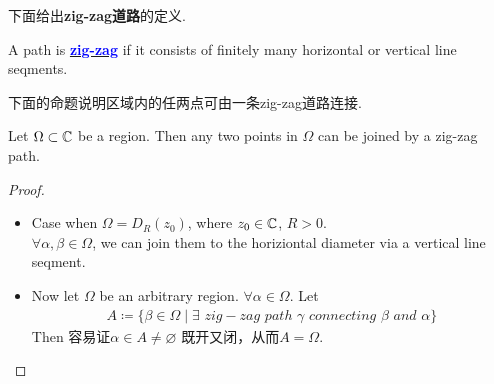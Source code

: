 	\vspace{2em}
	下面给出\textbf{zig-zag道路}的定义.
	\begin{defn}\label{def 3.4.7}
		A path is \underline{\textcolor{blue}{\textbf{zig-zag}}} if it consists of finitely many horizontal or vertical line seqments.
	\end{defn}

	\vspace{2em}
	下面的命题说明区域内的任两点可由一条zig-zag道路连接.
	\begin{proposition}\label{prop 3.4.1}
		Let $\Omega \subset \mathbb{C}$ be a region. Then any two points in $\Omega$ can be joined by a zig-zag path.
		
		\vspace{2em}
		\begin{proof}
			\begin{itemize}
				\item Case when $\Omega = D_{R}(z_0)$, where $z_0 \in \mathbb{C}$, $R > 0$.\\
				$\forall \alpha , \beta \in \Omega$, we can join them to the horiziontal diameter via a vertical line seqment.
				
				\item Now let $\Omega$ be an arbitrary region. $\forall \alpha \in \Omega$. Let
				\begin{align}
					A \coloneqq \{ \beta \in \Omega \mid \exists \,\, zig-zag \,\, path \,\, \gamma \,\, connecting \,\, \beta \,\, and \,\, \alpha \}
				\end{align}
				Then 容易证$\alpha \in A \neq \varnothing$ 既开又闭，从而$A = \Omega$.
			\end{itemize}
		\end{proof}
	\end{proposition}

\newpage
